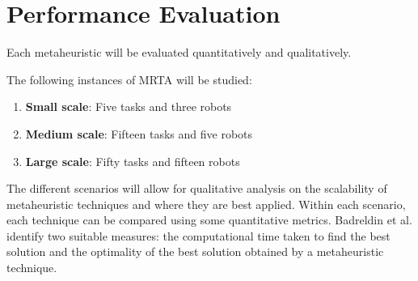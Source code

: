 \documentclass[a4paper]{article}
\begin{document}
\section{Performance Evaluation}







Each metaheuristic will be evaluated quantitatively and qualitatively.

The following instances of MRTA will be studied:
\begin{enumerate}
\item \textbf{Small scale}: Five tasks and three robots
\item \textbf{Medium scale}: Fifteen tasks and five robots
\item \textbf{Large scale}: Fifty tasks and fifteen robots
\end{enumerate}

The different scenarios will allow for qualitative analysis on the scalability of metaheuristic techniques and where they are best applied. Within each scenario, each technique can be compared using some quantitative metrics. Badreldin et al. \cite{Badreldin} identify two suitable measures: the computational time taken to find the best solution and the optimality of the best solution obtained by a metaheuristic technique.
\end{document}
